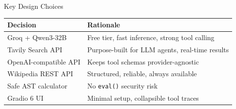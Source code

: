 \documentclass[aspectratio=169]{beamer}
\begin{document}
\begin{frame}{Key Design Choices}
  \begin{table}
    \begin{tabular}{ll}
      \toprule
      \textbf{Decision} & \textbf{Rationale} \\
      \midrule
      Groq + Qwen3-32B & Free tier, fast inference, strong tool calling \\[4pt]
      Tavily Search API & Purpose-built for LLM agents, real-time results \\[4pt]
      OpenAI-compatible API & Keeps tool schemas provider-agnostic \\[4pt]
      Wikipedia REST API & Structured, reliable, always available \\[4pt]
      Safe AST calculator & No \texttt{eval()} security risk \\[4pt]
      Gradio 6 UI & Minimal setup, collapsible tool traces \\
      \bottomrule
    \end{tabular}
  \end{table}
\end{frame}
\end{document}
